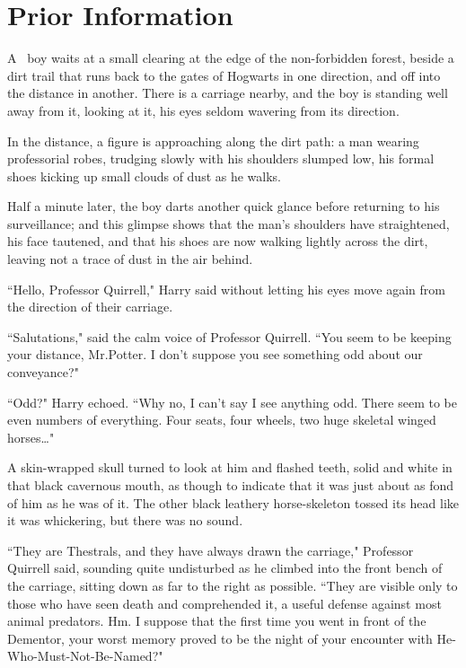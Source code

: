 \chapter{Prior Information}

\lettrine{A}{~} boy waits at a small clearing at the edge of the non-forbidden forest, beside a dirt trail that runs back to the gates of Hogwarts in one direction, and off into the distance in another. There is a carriage nearby, and the boy is standing well away from it, looking at it, his eyes seldom wavering from its direction.

In the distance, a figure is approaching along the dirt path: a man wearing professorial robes, trudging slowly with his shoulders slumped low, his formal shoes kicking up small clouds of dust as he walks.

Half a minute later, the boy darts another quick glance before returning to his surveillance; and this glimpse shows that the man's shoulders have straightened, his face tautened, and that his shoes are now walking lightly across the dirt, leaving not a trace of dust in the air behind.

``Hello, Professor Quirrell," Harry said without letting his eyes move again from the direction of their carriage.

``Salutations," said the calm voice of Professor Quirrell. ``You seem to be keeping your distance, Mr.\?Potter. I don't suppose you see something odd about our conveyance?"

``Odd?" Harry echoed. ``Why no, I can't say I see anything odd. There seem to be even numbers of everything. Four seats, four wheels, two huge skeletal winged horses{\ldots}"

A skin-wrapped skull turned to look at him and flashed teeth, solid and white in that black cavernous mouth, as though to indicate that it was just about as fond of him as he was of it. The other black leathery horse-skeleton tossed its head like it was whickering, but there was no sound.

``They are Thestrals, and they have always drawn the carriage," Professor Quirrell said, sounding quite undisturbed as he climbed into the front bench of the carriage, sitting down as far to the right as possible. ``They are visible only to those who have seen death and comprehended it, a useful defense against most animal predators. Hm. I suppose that the first time you went in front of the Dementor, your worst memory proved to be the night of your encounter with He-Who-Must-Not-Be-Named?"

